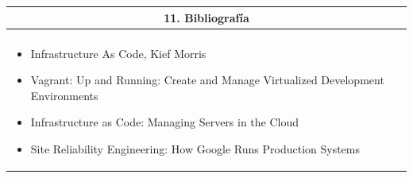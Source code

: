 \documentclass[letter,12pt]{article}
\begin{document}
\begin{center}
\begin{tabular}{|p{15.5cm}|}
\hline
\multicolumn{1}{|c|}{ \textbf{11. Bibliografía}}\\
\hline
\\
\begin{itemize}
    \item Infrastructure As Code,  Kief Morris
    \item Vagrant: Up and Running: Create and Manage Virtualized Development Environments
    \item Infrastructure as Code: Managing Servers in the Cloud
    \item Site Reliability Engineering: How Google Runs Production Systems
    
\end{itemize}

\\
\hline
\end{tabular}
\end{center}
\end{document}
